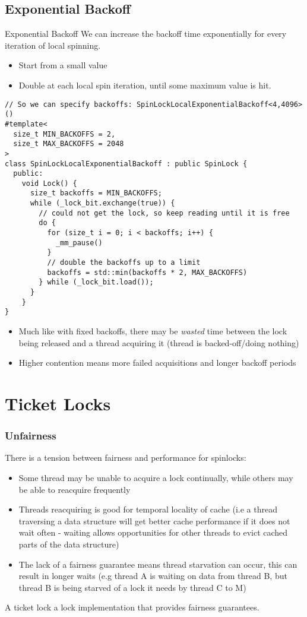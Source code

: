 \subsection{Exponential Backoff}
\begin{definitionbox}{Exponential Backoff}
	We can increase the backoff time exponentially for every iteration of local spinning.
	\begin{itemize}
		\item Start from a small value
		\item Double at each local spin iteration, until some maximum value is hit.
	\end{itemize}
\end{definitionbox}
\begin{verbatim}
// So we can specify backoffs: SpinLockLocalExponentialBackoff<4,4096>()
#template<
  size_t MIN_BACKOFFS = 2,
  size_t MAX_BACKOFFS = 2048
>
class SpinLockLocalExponentialBackoff : public SpinLock {
  public:
    void Lock() {
      size_t backoffs = MIN_BACKOFFS;
      while (_lock_bit.exchange(true)) { 
        // could not get the lock, so keep reading until it is free
        do {
          for (size_t i = 0; i < backoffs; i++) {
            _mm_pause()
          }
          // double the backoffs up to a limit
          backoffs = std::min(backoffs * 2, MAX_BACKOFFS)
        } while (_lock_bit.load());
      }
    }
}
\end{verbatim}
\begin{itemize}
	\item Much like with fixed backoffs, there may be \textit{wasted} time between the lock being released and a thread acquiring it (thread is backed-off/doing nothing)
	\item Higher contention means more failed acquisitions and longer backoff periods
\end{itemize}

\section{Ticket Locks}
\subsubsection{Unfairness}
There is a tension between fairness and performance for spinlocks:
\begin{itemize}
	\item Some thread may be unable to acquire a lock continually, while others may be able to reacquire frequently
	\item Threads reacquiring is good for temporal locality of cache (i.e a thread traversing a data structure will get better cache performance if it does not wait often - waiting allows opportunities for other threads to evict cached parts of the data structure)
	\item The lack of a fairness guarantee means thread starvation can occur, this can result in longer waits (e.g thread A is waiting on data from thread B, but thread B is being starved of a lock it needs by thread C to M)
\end{itemize}
A ticket lock a lock implementation that provides fairness guarantees.

